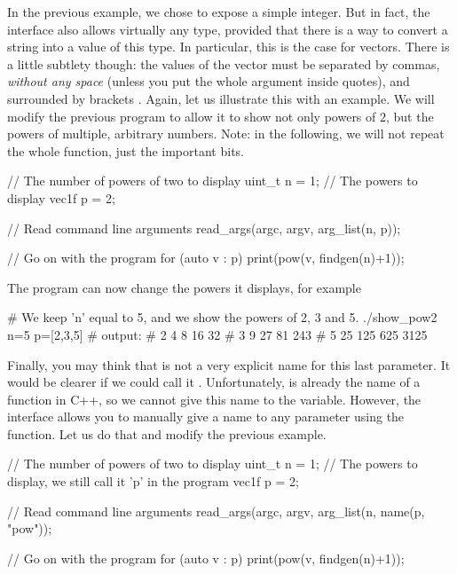 \documentclass[12pt]{report}
\newenvironment{example}
{
    \begin{mdframed}[style=example,frametitle={Example}]
}
{
    \end{mdframed}
}
\begin{document}
In the previous example, we chose to expose a simple integer. But in fact, the interface also allows virtually any type, provided that there is a way to convert a string into a value of this type. In particular, this is the case for vectors. There is a little subtlety though: the values of the vector must be separated by commas, \emph{without any space} (unless you put the whole argument inside quotes), and surrounded by brackets \cppinline{[...]}. Again, let us illustrate this with an example. We will modify the previous program to allow it to show not only powers of $2$, but the powers of multiple, arbitrary numbers. Note: in the following, we will not repeat the whole  function, just the important bits.

\begin{example}
\begin{cppcode}
    // The number of powers of two to display
    uint_t n = 1;
    // The powers to display
    vec1f p = {2};

    // Read command line arguments
    read_args(argc, argv, arg_list(n, p));

    // Go on with the program
    for (auto v : p) {
        print(pow(v, findgen(n)+1));
    }
\end{cppcode}
\end{example}

The program can now change the powers it displays, for example
\begin{bashcode}
# We keep 'n' equal to 5, and we show the powers of 2, 3 and 5.
./show_pow2 n=5 p=[2,3,5]
# output:
# 2 4 8 16 32
# 3 9 27 81 243
# 5 25 125 625 3125
\end{bashcode}

Finally, you may think that  is not a very explicit name for this last parameter. It would be clearer if we could call it . Unfortunately,  is already the name of a function in C++, so we cannot give this name to the variable. However, the  interface allows you to manually give a name to any parameter using the  function. Let us do that and modify the previous example.

\begin{example}
\begin{cppcode}
    // The number of powers of two to display
    uint_t n = 1;
    // The powers to display, we still call it 'p' in the program
    vec1f p = {2};

    // Read command line arguments
    read_args(argc, argv, arg_list(n, name(p, "pow"));

    // Go on with the program
    for (auto v : p) {
        print(pow(v, findgen(n)+1));
    }
\end{cppcode}
\end{example}
\end{document}
